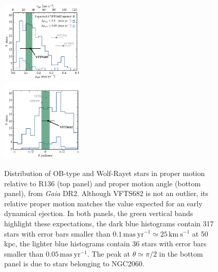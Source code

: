 \documentclass[a4paper,fleqn,usenatbib]{mnras}
\newcommand{\kms}{{\,\mathrm{km\ s^{-1}}}}
\begin{document}
\begin{figure}%
  \centering
  \includegraphics[width=0.35\textwidth]{figures/dist_mu_region.pdf}\\
  \vspace*{-5pt}
  \includegraphics[width=0.35\textwidth]{figures/angle}
  \caption{Distribution of OB-type and Wolf-Rayet stars in proper
    motion relative to R136 (top panel) and proper motion angle
    (bottom panel), from \emph{Gaia} DR2. Although VFTS682 is not an outlier, its relative
    proper motion matches the value expected for an early dynamical ejection. In both
    panels, the green vertical bands highlight these expectations, the dark blue histograms contain 317 
    stars with error bars smaller than $0.1\,\mathrm{mas \
      yr^{-1}}\simeq25\,\mathrm{km\ s^{-1}}$ at 50\,kpc, the
    lighter blue histograms contain 36 stars with error bars smaller than $0.05\,\mathrm{mas \
    yr^{-1}}$. The peak at $\theta\simeq\pi/2$ in the bottom panel is due to stars
  belonging to NGC2060. }
  \label{fig:dist}
\end{figure}
\end{document}
